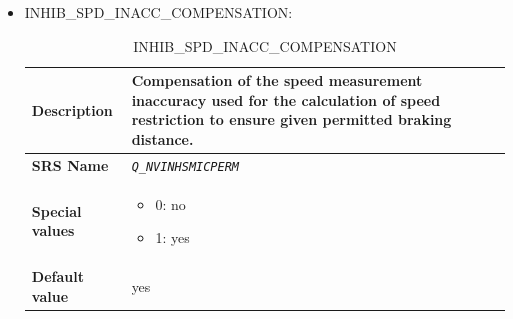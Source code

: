 \begin{itemize}
\begin{longtable}{|l|l|}
				\hline

			\end{longtable}
            
            
        \item INHIB\_SPD\_INACC\_COMPENSATION:
        
			\begin{longtable}{|l|l|}
				\caption{INHIB\_SPD\_INACC\_COMPENSATION}\\
				\hline

					\begin{minipage}[t]{0.22\linewidth} \textbf{Description}	\end{minipage}
				&	\begin{minipage}[t]{0.78\linewidth} Compensation of the speed measurement inaccuracy used for the calculation of speed restriction to ensure given permitted braking distance. \end{minipage} \\

				\hline

					\begin{minipage}[t]{0.22\linewidth} \textbf{SRS Name}	\end{minipage}
				&	\begin{minipage}[t]{0.78\linewidth} \emph{\texttt{Q\_NVINHSMICPERM}} \end{minipage} \\

				\hline

					\begin{minipage}[t]{0.22\linewidth} \textbf{Special values}	\end{minipage}
				&	\begin{minipage}[t]{0.78\linewidth} \begin{itemize} \item 0: no \item 1: yes \end{itemize} \end{minipage} \\

				\hline

					\begin{minipage}[t]{0.22\linewidth} \textbf{Default value}	\end{minipage}
				&	\begin{minipage}[t]{0.78\linewidth} yes \end{minipage} \\

				\hline

			\end{longtable}

	\end{itemize}

